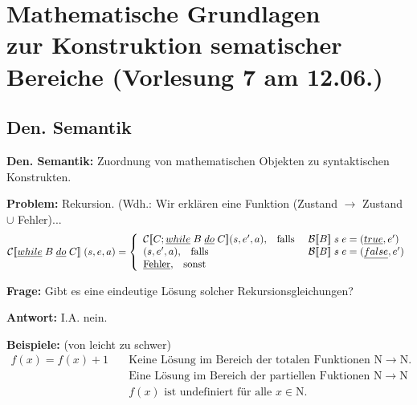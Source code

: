 \section{Mathematische Grundlagen \\ zur Konstruktion sematischer Bereiche \tiny (Vorlesung 7 am 12.06.)}
\subsection{Den. Semantik}
\begin{compactitem}
	\item[\textbf{Den. Semantik:}] Zuordnung von mathematischen Objekten zu syntaktischen Konstrukten.
	\item[\textbf{Problem:}] Rekursion. (Wdh.: Wir erklären eine Funktion (Zustand $\rightarrow$ Zustand $\cup$ Fehler)...
	\begin{align*}
			\mathcal{C}
[\![\underline{while}\;B\;\underline{do}\;C]\!]\;(s,e,a) &= \left\lbrace\begin{array}{l l} \mathcal{C}
[\![C;\underline{while}\;B\;\underline{do}\;C]\!](s,e',a)\text{,}\quad\text{falls }&\mathcal{B}
[\![B]\!]\;s\;e = (\underline{true}, e')\\
		(s,e',a)\text{,}\quad\text{falls }&\mathcal{B}
[\![B]\!]\;s\;e = (\underline{false}, e')\\
		\underline{\text{Fehler}}\text{,}\quad\text{sonst} \end{array}\right.\\
	\end{align*}
	\item[\textbf{Frage:}] Gibt es eine eindeutige Lösung solcher Rekursionsgleichungen?
	\item[\textbf{Antwort:}] I.A. nein.
	\item[\textbf{Beispiele:}] (von leicht zu schwer)
	\begin{align*}
	f(x) = f(x) + 1 &\quad\text{Keine Lösung im Bereich der totalen Funktionen } \mathrm{N}\rightarrow \mathrm{N}\text{.}\\
	&\quad\text{Eine Lösung im Bereich der partiellen Fuktionen } \mathrm{N}\rightarrow \mathrm{N}\\
	&\quad f(x)\text{ ist undefiniert für alle } x \in \mathrm{N}.\\\tag{Beispiel 1}\\
	\end{align*}
	\begin{align*}

\end{align*}
\end{compactitem}

